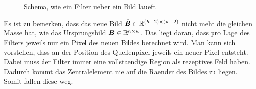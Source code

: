 \begin{figure}[h!]

  \caption{Schema, wie ein Filter ueber ein Bild laueft}
\end{figure}
\fi

Es ist zu bemerken, dass das neue Bild $\tilde{\bm{B}} \in \mathbb{R}^{(h-2) \times (w-2)}$ nicht mehr die gleichen Masse
hat, wie das Ursprungsbild $\bm{B} \in \mathbb{R}^{h \times w}$. Das liegt daran, dass pro
Lage des Filters jeweils nur ein Pixel des neuen Bildes berechnet wird. Man kann
sich vorstellen, dass an der Position des Quellenpixel jeweils ein neuer
Pixel entsteht. Dabei muss der Filter immer eine vollstaendige Region als
rezeptives Feld haben. Dadurch kommt das Zentralelement nie auf die Raender des
Bildes zu liegen. Somit fallen diese weg.
\para{}
\cite{deeplearning.ai:cnn}
\cite{wiki:convolution}

